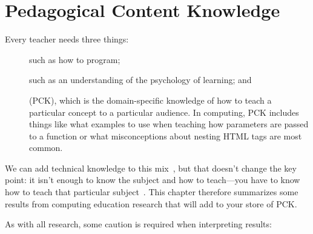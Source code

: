 \chapter{Pedagogical Content Knowledge}\label{s:pck}

Every teacher needs three things:

\begin{description}

\item[]
  such as how to program;

\item[]
  such as an understanding of the psychology of learning;
  and

\item[]
  (PCK),
  which is the domain-specific knowledge of
  how to teach a particular concept to a particular audience.
  In computing,
  PCK includes things like what examples to use when teaching how parameters are passed to a function
  or what misconceptions about nesting HTML tags are most common.

\end{description}

We can add technical knowledge to this mix~\cite{Koeh2013},
but that doesn't change the key point:
it isn't enough to know the subject and how to teach---you have to know
how to teach that particular subject~\cite{Maye2004}.
This chapter therefore summarizes some results from computing education research
that will add to your store of PCK.

As with all research,
some caution is required when interpreting results:

